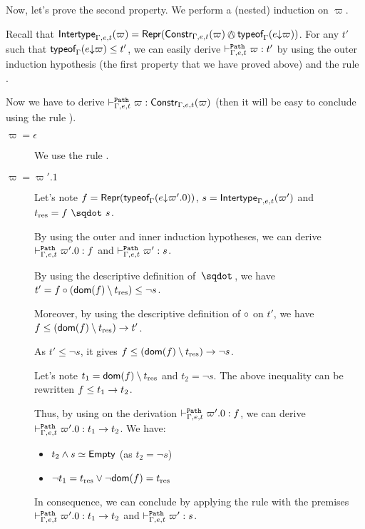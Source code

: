\documentclass[a4paper]{article}
\theoremstyle{definition}
\begin{document}
  Now, let's prove the second property.
  We perform a (nested) induction on $\varpi$.

  Recall that $\env {\Gamma,e,t} (\varpi) = \tsrep {\constr \varpi {\Gamma,e,t} \tsand \tyof {\occ e \varpi} \Gamma}$.
  For any $t'$ such that $\textsf{typeof}_{\Gamma}(e{\downarrow}\varpi) \leq t'$, we can easily derive $\vdash^{\texttt{Path}}_{\Gamma,e,t} \varpi : t'$ by using the outer induction hypothesis
  (the first property that we have proved above) and the rule .

  Now we have to derive $\vdash^{\texttt{Path}}_{\Gamma,e,t} \varpi : \textsf{Constr}_{\Gamma,e,t}(\varpi)$ (then it will be easy to conclude using the rule ).
  \begin{description}
    \item[$\varpi=\epsilon$] We use the rule .
    \item[$\varpi=\varpi'.1$]
    Let's note $f=\textsf{Repr}(\textsf{typeof}_{\Gamma}(e{\downarrow}\varpi'.0))$, $s=\textsf{Intertype}_{\Gamma,e,t} (\varpi')$ and $t_{\text{res}} = \worra f s$. 
    
    By using the outer and inner induction hypotheses, we can derive $\vdash^{\texttt{Path}}_{\Gamma,e,t} \varpi'.0 : f$ and $\vdash^{\texttt{Path}}_{\Gamma,e,t} \varpi' : s$.

    By using the descriptive definition of $\worra {} {}$, we have $t' = f\circ(\textsf{dom}(f) \setminus t_{\text{res}}) \leq \neg s$.

    Moreover, by using the descriptive definition of $\circ$ on $t'$, we have
    $f \leq (\textsf{dom}(f) \setminus t_{\text{res}})\to t'$.

    As $t'\leq \neg s$, it gives $f \leq (\textsf{dom}(f) \setminus t_{\text{res}})\to \neg s$.

    Let's note $t_1 = \textsf{dom}(f) \setminus t_{\text{res}}$ and $t_2 = \neg s$. The above inequality can be rewritten $f \leq t_1\to t_2$.

    Thus, by using  on the derivation $\vdash^{\texttt{Path}}_{\Gamma,e,t} \varpi'.0 : f$, we can derive $\vdash^{\texttt{Path}}_{\Gamma,e,t} \varpi'.0 : t_1\to t_2$.
    We have:
    \begin{itemize}
      \item $t_2 \land s \simeq \textsf{Empty}$ (as $t_2 = \neg s$)
      \item $\neg t_1 = t_{\text{res}} \vee \neg \textsf{dom}(f) = t_{\text{res}}$
    \end{itemize}
    
    In consequence, we can conclude by applying the rule 
    with the premises $\vdash^{\texttt{Path}}_{\Gamma,e,t} \varpi'.0 : t_1\to t_2$ and $\vdash^{\texttt{Path}}_{\Gamma,e,t} \varpi' : s$.


\end{description}
\end{document}
